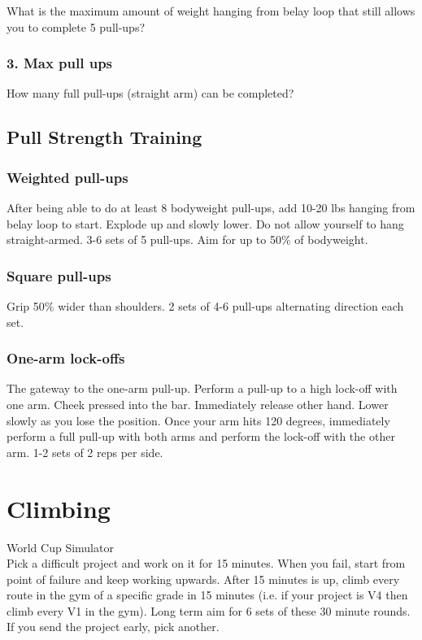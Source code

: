 \documentclass[12pt, letterpaper]{article}
\begin{document}
What is the maximum amount of weight hanging from belay loop that still
allows you to complete 5 pull-ups?

\subsubsection{3. Max pull ups}

How many full pull-ups (straight arm) can be completed? 

\subsection{Pull Strength Training}

\subsubsection{Weighted pull-ups}

After being able to do at least 8 bodyweight pull-ups, add 10-20 lbs hanging 
from belay loop to start. Explode up and slowly lower. Do not allow yourself to hang straight-armed. 
3-6 sets of 5 pull-ups. Aim for up to 50\% of bodyweight. 

\subsubsection{Square pull-ups}

Grip 50\% wider than shoulders. 2 sets of 4-6 pull-ups alternating direction each set.

\subsubsection{One-arm lock-offs}

The gateway to the one-arm pull-up. Perform a pull-up to a high lock-off with one arm. Cheek pressed into the bar. 
Immediately release other hand. Lower slowly as you lose the position. Once your arm hits 120 degrees, immediately
 perform a full pull-up with both arms and perform the lock-off with the other arm. 
  1-2 sets of 2 reps per side.

\newpage %


\section{Climbing}

\item World Cup Simulator \\ 
Pick a difficult project and work on it for 15 minutes. When you fail, start from 
point of failure and keep working upwards. After 15 minutes is up, climb every route
 in the gym of a specific grade in 15 minutes (i.e. if your project is V4 then climb 
 every V1 in the gym). Long term aim for 6 sets of these 30 minute rounds. If you send the
 project early, pick another.
\end{document}
